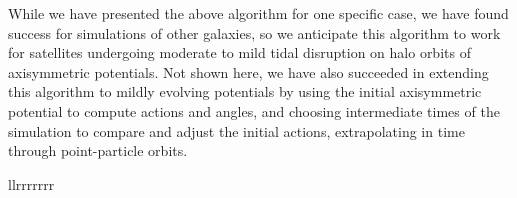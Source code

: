 \documentclass[times,trackchanges, twocolumn, twocolappendix]{aastex701}
\begin{document}
While we have presented the above algorithm for one specific case, we have found success for simulations of other galaxies, so we anticipate this algorithm to work for satellites undergoing moderate to mild tidal disruption on halo orbits of axisymmetric potentials. Not shown here, we have also succeeded in extending this algorithm to mildly evolving potentials by using the initial axisymmetric potential to compute actions and angles, and choosing intermediate times of the simulation to compare and adjust the initial actions, extrapolating in time through point-particle orbits. 



\begin{deluxetable*}{llrrrrrrr}


\end{deluxetable*}
\end{document}
